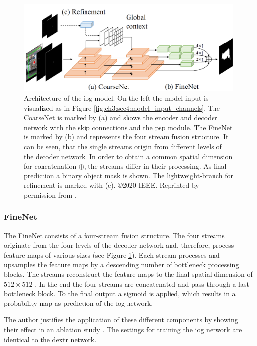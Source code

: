 \begin{figure}
	\includegraphics[width=\linewidth]{figures/chap34_iog_arch.png}
	\caption[IOG Architecture]{		
		Architecture of the \gls{iog} model.
		On the left the model input is visualized as in Figure \ref{fig:ch3:sec4:model_input_channels}.
		The CoarseNet is marked by (a) and shows the encoder and decoder network with the skip connections and the \gls{psp} module.
		The FineNet is marked by (b) and represents the four stream fusion structure.
		It can be seen, that the single streams origin from different levels of the decoder network.
		In order to obtain a common spatial dimension for concatenation $ \oplus $, the streams differ in their processing.
		As final prediction a binary object mask is shown.
		The lightweight-branch for refinement is marked with (c).
		\copyright 2020 IEEE. Reprinted by permission from \cite{Zha20-IOG}.
	}
	\label{fig:ch3:sec4:arch}
\end{figure}

\subsubsection{FineNet}
The FineNet consists of a four-stream fusion structure.
The four streams originate from the four levels of the decoder network and, therefore, process feature maps of various sizes (see Figure \ref{fig:ch3:sec4:arch}).
Each stream processes and upsamples the feature maps by a descending number of bottleneck processing blocks.
The streams reconstruct the feature maps to the final spatial dimension of $512 \times 512$ .
In the end the four streams are concatenated and pass through a last bottleneck block.
To the final output a sigmoid is applied, which results in a probability map as prediction of the \gls{iog} network.

The author justifies the application of these different components by showing their effect in an ablation study \cite{Zha20-IOG}.
The settings for training the \gls{iog} network are identical to the \gls{dextr} network.

